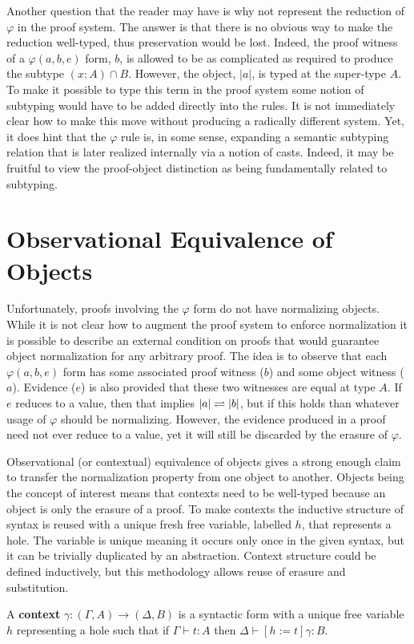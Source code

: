 Another question that the reader may have is why not represent the reduction of $\varphi$ in the proof system.
The answer is that there is no obvious way to make the reduction well-typed, thus preservation would be lost.
Indeed, the proof witness of a $\varphi(a, b, e)$ form, $b$, is allowed to be as complicated as required to produce the subtype $(x : A) \cap B$.
However, the object, $|a|$, is typed at the super-type $A$.
To make it possible to type this term in the proof system some notion of subtyping would have to be added directly into the rules.
It is not immediately clear how to make this move without producing a radically different system.
Yet, it does hint that the $\varphi$ rule is, in some sense, expanding a semantic subtyping relation that is later realized internally via a notion of casts.
Indeed, it may be fruitful to view the proof-object distinction as being fundamentally related to subtyping.

\section{Observational Equivalence of Objects}

Unfortunately, proofs involving the $\varphi$ form do not have normalizing objects.
While it is not clear how to augment the proof system to enforce normalization it is possible to describe an external condition on proofs that would guarantee object normalization for any arbitrary proof.
The idea is to observe that each $\varphi(a, b, e)$ form has some associated proof witness ($b$) and some object witness ($a$).
Evidence ($e$) is also provided that these two witnesses are equal at type $A$.
If $e$ reduces to a value, then that implies $|a| \rightleftharpoons |b|$, but if this holds than whatever usage of $\varphi$ should be normalizing.
However, the evidence produced in a proof need not ever reduce to a value, yet it will still be discarded by the erasure of $\varphi$.

Observational (or contextual) equivalence of objects gives a strong enough claim to transfer the normalization property from one object to another.
Objects being the concept of interest means that contexts need to be well-typed because an object is only the erasure of a proof.
To make contexts the inductive structure of syntax is reused with a unique fresh free variable, labelled $h$, that represents a hole.
The variable is unique meaning it occurs only once in the given syntax, but it can be trivially duplicated by an abstraction.
Context structure could be defined inductively, but this methodology allows reuse of erasure and substitution.
\begin{definition}
    A \textbf{context} $\gamma : (\Gamma, A) \to (\Delta, B)$ is a syntactic form with a unique free variable $h$ representing a hole such that if $\Gamma \vdash t : A$ then $\Delta \vdash [h := t]\gamma : B$.
\end{definition}

